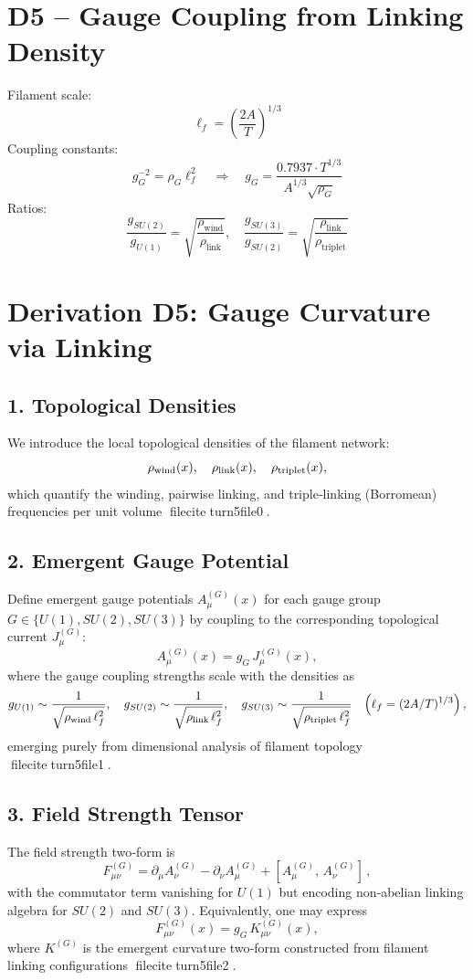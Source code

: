 \section*{D5 – Gauge Coupling from Linking Density}
Filament scale:
\[
\ell_f = \left( \frac{2A}{T} \right)^{1/3}
\]
Coupling constants:
\[
g_G^{-2} = \rho_G \ell_f^2 \quad \Rightarrow \quad g_G = \frac{0.7937 \cdot T^{1/3}}{A^{1/3} \sqrt{\rho_G}}
\]
Ratios:
\[
\frac{g_{SU(2)}}{g_{U(1)}} = \sqrt{\frac{\rho_{\text{wind}}}{\rho_{\text{link}}}}, \quad
\frac{g_{SU(3)}}{g_{SU(2)}} = \sqrt{\frac{\rho_{\text{link}}}{\rho_{\text{triplet}}}}
\]



\section*{Derivation D5: Gauge Curvature via Linking}
\subsection*{1. Topological Densities}
We introduce the local topological densities of the filament network:
\[
\rho_{\rm wind}(x), \quad 
\rho_{\rm link}(x), \quad
\rho_{\rm triplet}(x),
\]
which quantify the winding, pairwise linking, and triple‑linking (Borromean) frequencies per unit volume fileciteturn5file0.

\subsection*{2. Emergent Gauge Potential}
Define emergent gauge potentials \(A_\mu^{(G)}(x)\) for each gauge group \(G\in\{U(1),SU(2),SU(3)\}\) by coupling to the corresponding topological current \(J_\mu^{(G)}\):
\[
A_\mu^{(G)}(x) = g_G\,J_\mu^{(G)}(x),
\]
where the gauge coupling strengths scale with the densities as
\[
g_{U(1)}\sim\frac{1}{\sqrt{\rho_{\rm wind}\,\ell_f^2}},\quad
g_{SU(2)}\sim\frac{1}{\sqrt{\rho_{\rm link}\,\ell_f^2}},\quad
g_{SU(3)}\sim\frac{1}{\sqrt{\rho_{\rm triplet}\,\ell_f^2}}
\quad\Bigl(\ell_f=(2A/T)^{1/3}\Bigr)\,, 
\]
emerging purely from dimensional analysis of filament topology fileciteturn5file1.

\subsection*{3. Field Strength Tensor}
The field strength two‑form is
\[
F_{\mu\nu}^{(G)} 
= \partial_\mu A_\nu^{(G)} - \partial_\nu A_\mu^{(G)} 
+ [A_\mu^{(G)},\,A_\nu^{(G)}]\,,
\]
with the commutator term vanishing for \(U(1)\) but encoding non‑abelian linking algebra for \(SU(2)\) and \(SU(3)\).  Equivalently, one may express
\[
F_{\mu\nu}^{(G)}(x)
= g_G\,K_{\mu\nu}^{(G)}(x),
\]
where \(K^{(G)}\) is the emergent curvature two‑form constructed from filament linking configurations fileciteturn5file2.

